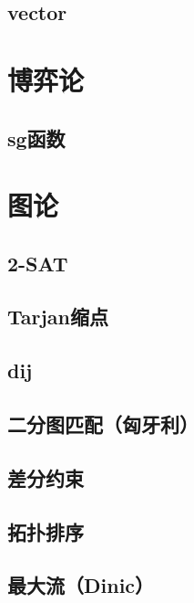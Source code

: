 \documentclass[11pt,a4paper]{ctexart}
\begin{document}
\subsection{vector}


\section{博弈论}
\subsection{sg函数}


\section{图论}
\subsection{2-SAT}


\subsection{Tarjan缩点}


\subsection{dij}


\subsection{二分图匹配（匈牙利）}


\subsection{差分约束}


\subsection{拓扑排序}


\subsection{最大流（Dinic）}

\end{document}
